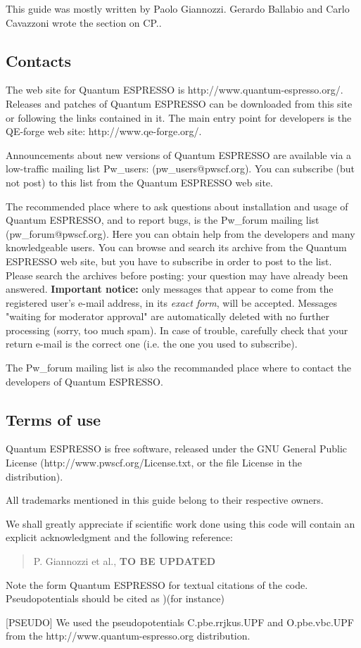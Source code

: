 \documentclass[12pt,a4paper]{article}
\begin{document}
This guide was mostly written by Paolo Giannozzi.
Gerardo Ballabio and Carlo Cavazzoni wrote the section on CP..

\subsection{Contacts}

The web site for Quantum ESPRESSO is http://www.quantum-espresso.org/.
Releases and patches of Quantum ESPRESSO can be downloaded from this
site or following the links contained in it. The main entry point for 
developers is the QE-forge web site: http://www.qe-forge.org/.

Announcements about new versions of Quantum ESPRESSO are available 
via a low-traffic mailing list Pw\_users: (pw\_users@pwscf.org). You can
subscribe (but not post) to this list from the Quantum ESPRESSO web site.
    
The recommended place where to ask questions about installation and
usage of Quantum ESPRESSO, and to report bugs, is the Pw\_forum mailing
list (pw\_forum@pwscf.org). Here you can obtain help from the developers
and many knowledgeable users. You can browse and search its archive from 
the Quantum ESPRESSO web site, but you have to subscribe in order to post 
to the list.
Please search the archives before posting: your question may have already
been answered.
{\bf Important notice:} only messages that appear to come from the 
registered user's e-mail address, in its {\em exact form}, will be
accepted. Messages "waiting for moderator approval" are automatically 
deleted with no further processing (sorry, too much spam). In case of 
trouble, carefully check that your return e-mail is the correct one 
(i.e. the one you used to subscribe).

The Pw\_forum mailing list is also the recommanded place where to 
contact the developers of Quantum ESPRESSO.
 
\subsection{Terms of use}

Quantum ESPRESSO is free software, released under the 
GNU General Public License 
(http://www.pwscf.org/License.txt, or the file License in the
distribution).
    
All trademarks mentioned in this guide belong to their respective owners.
    
We shall greatly appreciate if scientific work done using this code will 
contain an explicit acknowledgment and the following reference:
\begin{quote}
P. Giannozzi et al., {\bf TO BE UPDATED}
\end{quote}
Note the form {\sc Quantum ESPRESSO} for textual citations of the code.
Pseudopotentials should be cited as )(for instance)

[PSEUDO] We used the pseudopotentials C.pbe.rrjkus.UPF
and O.pbe.vbc.UPF from the http://www.quantum-espresso.org 
distribution.
\end{document}
